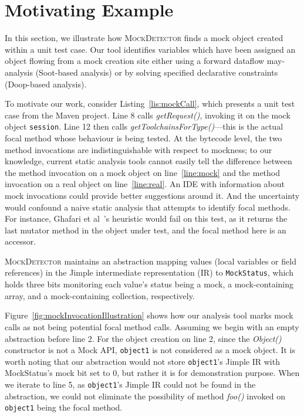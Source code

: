 \section{Motivating Example}
\label{sec:motivating-example}

In this section, we illustrate how \textsc{MockDetector} finds a mock object created within a unit test case. Our tool identifies variables which have been assigned an object flowing from a mock creation site either using a forward dataflow may-analysis (Soot-based analysis) or by solving specified declarative constraints (Doop-based analysis).


To motivate our work, consider Listing~\ref{lis:mockCall}, which presents a unit test case from the Maven project. Line 8 calls \textit{getRequest()}, invoking it on the mock object \texttt{session}. Line 12 then calls \textit{getToolchainsForType()}---this is the actual focal method whose behaviour is being tested. At the bytecode level, the two method invocations are indistinguishable with respect to mockness; to our knowledge, current static analysis tools cannot easily tell the difference between the method invocation on a mock object on line~\ref{line:mock} and the method invocation on a real object on line~\ref{line:real}. An IDE with information about mock invocations could provide better suggestions around it. And the uncertainty would confound a naive static analysis that attempts to identify focal methods. For instance, Ghafari et al~\cite{ghafari15:_autom}'s heuristic would fail on this test, as it returns the last mutator method in the object under test, and the focal method here is an accessor. 


\textsc{MockDetector} maintains an abstraction mapping values (local variables or field references) in the Jimple intermediate representation (IR) to \texttt{MockStatus}, which holds three bits monitoring each value's status being a mock, a mock-containing array, and a mock-containing collection, respectively.

Figure~\ref{fig:mockInvocationIllustration} shows how our analysis tool marks mock calls as not being potential focal method calls. Assuming we begin with an empty abstraction before line 2. For the object creation on line 2, since the \textit{Object()} constructor is not a Mock API, \texttt{object1} is not considered as a mock object. It is worth noting that our abstraction would not store \texttt{object1}'s Jimple IR with MockStatus's mock bit set to 0, but rather it is for demonstration purpose. When we iterate to line 5, as \texttt{object1}'s Jimple IR could not be found in the abstraction, we could not eliminate the possibility of method \textit{foo()} invoked on \texttt{object1} being the focal method.

